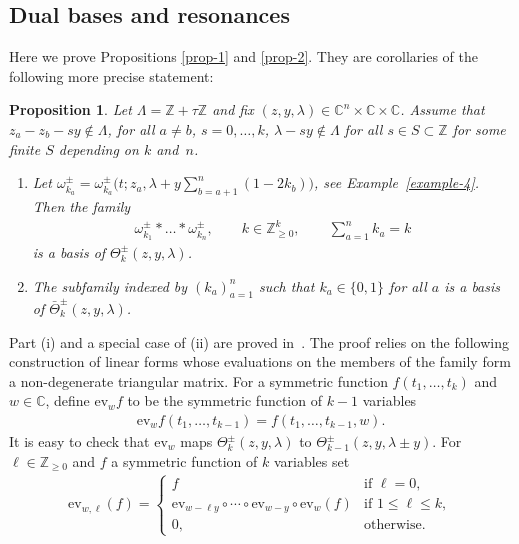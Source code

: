 \documentclass[10pt,a4paper]{amsart}
\numberwithin{equation}{section}
\newtheorem{Proposition}[Theorem]{Proposition}
 { \theoremstyle{definition}
\newtheorem{Definition}[Theorem]{Definition}
\newtheorem{Example}[Theorem]{Example}
\newtheorem{Remark}[Theorem]{Remark} }
\begin{document}
\subsection{Dual bases and resonances}\label{ss-3.12}
Here we prove Propositions \ref{prop-1} and \ref{prop-2}. They are corollaries of the following more precise statement:
\begin{Proposition}\label{prop-6} Let $\Lambda=\mathbb Z+\tau\mathbb Z$ and fix $(z,y,\lambda)\in\mathbb C^n\times \mathbb C\times \mathbb C$. Assume that $z_a-z_b-sy\not\in\Lambda$, for all $a\neq b$, $s=0,\dots,k$, $\lambda-sy\not\in\Lambda$ for all $s\in S\subset\mathbb Z$ for some finite $S$ depending on $k$ and~$n$.
 \begin{enumerate}\itemsep=0pt
 \item[$(i)$] Let $\omega^\pm_{k_a}=\omega_{k_a}^\pm\Big(t;z_a,\lambda+y\sum\limits_{b=a+1}^n(1-2k_b)\Big)$, see Example~{\rm \ref{example-4}}. Then the family
 \begin{gather*}
 \omega^\pm_{k_1}*\dots*\omega^\pm_{k_n}, \qquad k\in\mathbb Z^k_{\geq0},\qquad\sum_{a=1}^n k_a=k
 \end{gather*}
 is a basis of $\Theta^\pm_k(z,y,\lambda)$.
 \item[$(ii)$] The subfamily indexed by $(k_a)_{a=1}^n$ such that $k_a\in\{0,1\}$ for all $a$ is a basis of $\bar\Theta^\pm_k(z,y,\lambda)$.
 \end{enumerate}
\end{Proposition}
Part (i) and a special case of (ii) are proved in~\cite{FelderTarasovVarchenko1997}. The proof relies on the following construction of linear forms whose evaluations on the members of the family form a non-degenerate triangular matrix. For a symmetric function $f(t_1,\dots,t_k)$ and $w\in\mathbb C$, define $\mathrm{ev}_wf$ to be the symmetric function of $k-1$ variables
\begin{gather*}
 \mathrm{ev}_wf(t_1,\dots,t_{k-1})=f(t_1,\dots,t_{k-1},w).
\end{gather*}
It is easy to check that $\mathrm{ev}_w$ maps $\Theta^\pm_k(z,y,\lambda)$ to $\Theta^\pm_{k-1}(z,y,\lambda\pm y)$. For $\ell\in\mathbb Z_{\geq0}$ and $f$ a symmetric function of $k$ variables set
\begin{gather*}
 \mathrm{ev}_{w,\ell}(f)=\begin{cases}
 f&\text{if $\ell=0$},\\
 \mathrm{ev}_{w-\ell y}\circ\cdots\circ\mathrm{ev}_{w-y}\circ\mathrm{ev}_w(f) &\text{if $1\leq\ell\leq k$},\\
 0,&\text{otherwise}.
 \end{cases}
\end{gather*}
\end{document}
